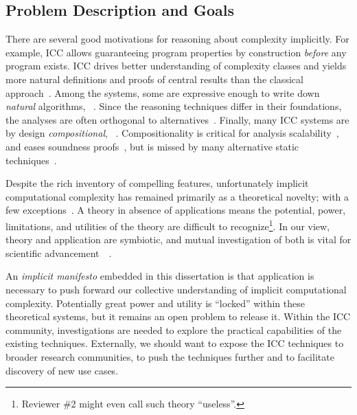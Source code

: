 \subsection{Problem Description and Goals}

There are several good motivations for reasoning about complexity implicitly.
For example, ICC allows guaranteeing program properties by construction \emph{before} any program exists.
ICC drives better understanding of complexity classes and yields more natural definitions and proofs of central results than the classical approach~\cite{kristiansen2017}.
Among the systems, some are expressive enough to write down \emph{natural} algorithms, \eg~\cite{jones2009,marion2011}.
Since the reasoning techniques differ in their foundations, the analyses are often orthogonal to alternatives~\cite{aubert20222}.
Finally, many ICC systems are by design \emph{compositional}, \eg~\cite{jones2009,marion2011,hainry2023,atkey2024}.
Compositionality is critical for analysis scalability~\cite{carbonneaux2015}, and eases soundness proofs~\cite{keidel2021},
but is missed by many alternative static techniques~\cite{carbonneaux2015,schiebel2024}.

Despite the rich inventory of compelling features, unfortunately implicit computational complexity has remained primarily as a theoretical novelty;
with a few exceptions~\cite{avanzini2017,avanzini2008,moyen20172,hoffmann2012,hainry2021,feree2018}.
A theory in absence of applications means the potential, power, limitations, and utilities of the theory are difficult to recognize\footnote{
Reviewer \#2 might even call such theory \enquote{useless}.}.
In our view, theory and application are symbiotic, and mutual investigation of both is vital for scientific advancement~\cite[pg. xxxv]{bishop2003}~\cite[p. 75]{moyen2017}.

An \emph{implicit manifesto} embedded in this dissertation is that application is necessary to push forward our collective understanding of implicit computational complexity.
Potentially great power and utility is \enquote{locked} within these theoretical systems, but it remains an open problem to release it.
Within the ICC community, investigations are needed to explore the practical capabilities of the existing techniques.
Externally, we should want to expose the ICC techniques to broader research communities, to push the techniques further and to facilitate discovery of new use cases.

